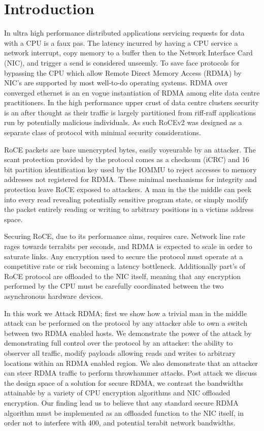 
\section{Introduction}
\label{sec:intro}

In ultra high performance distributed applications servicing requests for data
with a CPU is a faux pas. The latency incurred by having a CPU
service a network interrupt, copy memory to a buffer then to the Network
Interface Card (NIC), and trigger a send is considered unseemly. To save face
protocols for bypassing the CPU which allow Remote Direct Memory Access (RDMA)
by NIC's are supported by most well-to-do operating systems. RDMA over
converged ethernet is an en vogue instantiation of RDMA among elite data centre
practitioners. In the high performance upper crust of data centre clusters
security is an after thought as their traffic is largely partitioned from
riff-raff applications run by potentially malicious individuals. As such RoCEv2
was designed as a separate class of protocol with minimal security considerations.

RoCE packets are bare unencrypted bytes, easily voyeurable by an attacker. The
scant protection provided by the protocol comes as a checksum (iCRC) and 16 bit
partition identification key used by the IOMMU to reject accesses to memory
addresses not registered for RDMA. These minimal mechanisms for integrity and
protection leave RoCE exposed to attackers. A man in the the middle can peek
into every read revealing potentially sensitive program state, or simply modify
the packet entirely reading or writing to arbitrary positions in a victims
address space.

Securing RoCE, due to its performance aims, requires care. Network line rate
rages towards terrabits per seconds, and RDMA is expected to scale in order to
saturate links. Any encryption used to secure the protocol must operate at a
competitive rate or risk becoming a latency bottleneck. Additionally part's of
RoCE protocol are offloaded to the NIC itself, meaning that any encryption
performed by the CPU must be carefully coordinated between the two
asynchronous hardware devices.

In this work we Attack RDMA; first we show how a trivial man in the middle
attack can be performed on the protocol by any attacker able to own a switch
between two RDMA enabled hosts. We demonstrate the power of the attack by
demonstrating full control over the protocol by an attacker: the ability to
observer all traffic, modify payloads allowing reads and writes to arbitrary
locations within an RDMA enabled region. We also demonstrate that an attacker
can steer RDMA traffic to perform throwhammer attacks. Post attack we discuss
the design space of a solution for secure RDMA, we contrast the bandwidths
attainable by a variety of CPU encryption algorithms and NIC offloaded
encryption. Our finding lead us to believe that any standard secure RDMA
algorithm must be implemented as an offloaded function to the NIC itself, in
order not to interfere with 400, and potential terabit network bandwidths. 
